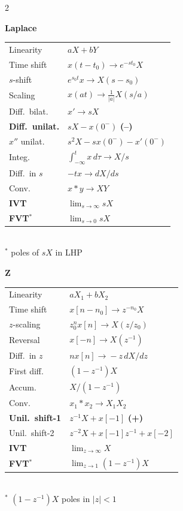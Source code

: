 \documentclass[12pt]{extarticle}
\newcommand{\twoup}[2]{%
  \noindent\begin{minipage}[t]{0.48\columnwidth}#1\end{minipage}\hfill%
  \begin{minipage}[t]{0.48\columnwidth}#2\end{minipage}\par\vspace{2pt}}
\begin{document}
\begin{multicols*}{2}
\twoup{%
\textbf{Laplace}\\[2pt]
\begin{tabular}{@{}l l@{}}
\toprule
Linearity & $aX+bY$ \\
Time shift & $x(t{-}t_0)\!\to\! e^{-st_0}X$ \\
$s$-shift & $e^{s_0 t}x\!\to\! X(s{-}s_0)$ \\
Scaling & $x(at)\!\to\!\tfrac{1}{|a|}X(s/a)$ \\
Diff.\ bilat. & $x'\!\to\! sX$ \\
\textbf{Diff.\ unilat.} & $sX{-}x(0^-)$ \textbf{(--)} \\
$x''$ unilat. & $s^2X{-}sx(0^-){-}x'(0^-)$ \\
Integ. & $\int_{-\infty}^t\!x\,d\tau\!\to\! X/s$ \\
Diff.\ in $s$ & $-tx\!\to\! dX/ds$ \\
Conv. & $x*y\!\to\! XY$ \\
\textbf{IVT} & $\lim_{s\to\infty}\!sX$ \\
\textbf{FVT}$^\ast$ & $\lim_{s\to 0}\!sX$ \\
\bottomrule
\end{tabular}\\[1pt]
{\footnotesize$^\ast$ poles of $sX$ in LHP}
}{%
\textbf{Z}\\[2pt]
\begin{tabular}{@{}l l@{}}
\toprule
Linearity & $aX_1{+}bX_2$ \\
Time shift & $x[n{-}n_0]\!\to\! z^{-n_0}X$ \\
$z$-scaling & $z_0^n x[n]\!\to\! X(z/z_0)$ \\
Reversal & $x[-n]\!\to\! X(z^{-1})$ \\
Diff.\ in $z$ & $nx[n]\!\to\!{-}z\,dX/dz$ \\
First diff. & $(1{-}z^{-1})X$ \\
Accum. & $X/(1{-}z^{-1})$ \\
Conv. & $x_1\!*\!x_2\!\to\! X_1X_2$ \\
\textbf{Unil.\ shift-1} & $z^{-1}X{+}x[-1]$ \textbf{(+)} \\
Unil.\ shift-2 & $z^{-2}X{+}x[-1]z^{-1}{+}x[-2]$ \\
\textbf{IVT} & $\lim_{z\to\infty}\!X$ \\
\textbf{FVT}$^\ast$ & $\lim_{z\to 1}(1{-}z^{-1})X$ \\
\bottomrule
\end{tabular}\\[1pt]
{\footnotesize$^\ast$ $(1{-}z^{-1})X$ poles in $|z|{<}1$}
}


\end{multicols*}
\end{document}
